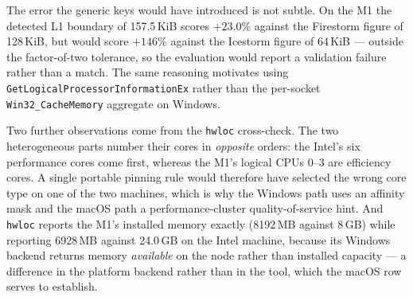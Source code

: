 \documentclass[conference]{IEEEtran}
\begin{document}
The error the generic keys would have introduced is not subtle. On the M1 the
detected L1 boundary of 157.5\,KiB scores $+23.0\%$ against the Firestorm figure
of 128\,KiB, but would score $+146\%$ against the Icestorm figure of 64\,KiB ---
outside the factor-of-two tolerance, so the evaluation would report a validation
failure rather than a match. The same reasoning motivates using
\texttt{GetLogicalProcessorInformationEx} rather than the per-socket
\texttt{Win32\_CacheMemory} aggregate on Windows.

Two further observations come from the \texttt{hwloc} cross-check. The two
heterogeneous parts number their cores in \emph{opposite} orders: the Intel's six
performance cores come first, whereas the M1's logical CPUs 0--3 are efficiency
cores. A single portable pinning rule would therefore have selected the wrong core
type on one of the two machines, which is why the Windows path uses an affinity
mask and the macOS path a performance-cluster quality-of-service hint. And
\texttt{hwloc} reports the M1's installed memory exactly (8192\,MB against 8\,GB)
while reporting 6928\,MB against 24.0\,GB on the Intel machine, because its
Windows backend returns memory \emph{available} on the node rather than installed
capacity --- a difference in the platform backend rather than in the tool, which
the macOS row serves to establish.
\end{document}
